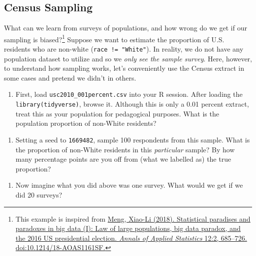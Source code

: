 \documentclass[
  letterpaper,
]{book}
\providecommand{\tightlist}{%
  \setlength{\itemsep}{0pt}\setlength{\parskip}{0pt}}\usepackage{longtable,booktabs,array}
\theoremstyle{definition}
\theoremstyle{definition}
\theoremstyle{plain}
\theoremstyle{definition}
\theoremstyle{plain}
\theoremstyle{plain}
\theoremstyle{remark}
\begin{document}
\hypertarget{census-sampling}{%
\subsection*{Census Sampling}\label{census-sampling}}

What can we learn from surveys of populations, and how wrong do we get
if our sampling is biased?\footnote{This example is inspired from
  \href{https://statistics.fas.harvard.edu/files/statistics-2/files/statistical_paradises_and_paradoxes.pdf}{Meng,
  Xiao-Li (2018). Statistical paradises and paradoxes in big data (I):
  Law of large populations, big data paradox, and the 2016 US
  presidential election. \emph{Annals of Applied Statistics} 12:2,
  685--726. doi:10.1214/18-AOAS1161SF.}} Suppose we want to estimate the
proportion of U.S. residents who are non-white
(\texttt{race\ !=\ "White"}). In reality, we do not have any population
dataset to utilize and so we \emph{only see the sample survey}. Here,
however, to understand how sampling works, let's conveniently use the
Census extract in some cases and pretend we didn't in others.

\begin{enumerate}
\def\labelenumi{(\alph{enumi})}
\tightlist
\item
  First, load \texttt{usc2010\_001percent.csv} into your R session.
  After loading the \texttt{library(tidyverse)}, browse it. Although
  this is only a 0.01 percent extract, treat this as your population for
  pedagogical purposes. What is the population proportion of non-White
  residents?
\end{enumerate}

\begin{enumerate}
\def\labelenumi{(\alph{enumi})}
\setcounter{enumi}{1}
\tightlist
\item
  Setting a seed to \texttt{1669482}, sample 100 respondents from this
  sample. What is the proportion of non-White residents in this
  \emph{particular} sample? By how many percentage points are you off
  from (what we labelled as) the true proportion?
\end{enumerate}

\begin{enumerate}
\def\labelenumi{(\alph{enumi})}
\setcounter{enumi}{2}
\tightlist
\item
  Now imagine what you did above was one survey. What would we get if we
  did 20 surveys?
\end{enumerate}
\end{document}
